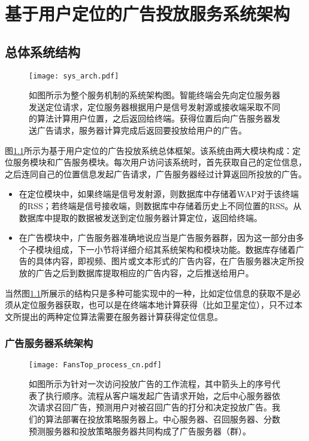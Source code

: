 \chapter{基于用户定位的广告投放服务系统架构}
\label{cha:sys_arch}

\section{总体系统结构}

\begin{figure}
	\centering
	\texttt{[image: sys\_arch.pdf]}
	\caption{如图所示为整个服务机制的系统架构图。智能终端会先向定位服务器发送定位请求，定位服务器根据用户是信号发射源或接收端采取不同的算法计算用户位置，之后返回给终端。获得位置后向广告服务器发送广告请求，服务器计算完成后返回要投放给用户的广告。}
	\label{fig:sysarch}
\end{figure}

图\ref{fig:sysarch}所示为基于用户定位的广告投放系统总体框架。该系统由两大模块构成：定位服务模块和广告服务模块。每次用户访问该系统时，首先获取自己的定位信息，之后连同自己的位置信息发起广告请求，广告服务器经过计算返回所投放的广告。
\begin{itemize}
	\item 在定位模块中，如果终端是信号发射源，则数据库中存储着WAP对于该终端的RSS；若终端是信号接收端，则数据库中存储着历史上不同位置的RSS。从数据库中提取的数据被发送到定位服务器计算定位，返回给终端。
	\item 在广告模块中，广告服务器准确地说应当是广告服务器群，因为这一部分由多个子模块组成，下一小节将详细介绍其系统架构和模块功能。数据库存储着广告的具体内容，即视频、图片或文本形式的广告内容，在广告服务器决定所投放的广告之后到数据库提取相应的广告内容，之后推送给用户。
\end{itemize}

当然图\ref{fig:sysarch}所展示的结构只是多种可能实现中的一种，比如定位信息的获取不是必须从定位服务器获取，也可以是在终端本地计算获得（比如卫星定位），只不过本文所提出的两种定位算法需要在服务器计算获得定位信息。

\subsection{广告服务器系统架构}

\begin{figure}
	\centering
	\texttt{[image: FansTop\_process\_cn.pdf]}
	\caption{如图所示为针对一次访问投放广告的工作流程，其中箭头上的序号代表了执行顺序。流程从客户端发起广告请求开始，之后中心服务器依次请求召回广告，预测用户对被召回广告的打分和决定投放广告。我们的算法部署在投放策略服务器上。中心服务器、召回服务器、分数预测服务器和投放策略服务器共同构成了广告服务器（群）。}
	\label{fig:fssys}
\end{figure}

